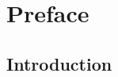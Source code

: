 \documentclass[../main/main]{subfiles}
\begin{document}
\renewcommand{\thefigure}{\Roman{chapter}.\Roman{figure}}
\renewcommand{\thetable}{\Roman{chapter}.\Roman{table}}

\renewcommand{\thechapter}{\Roman{chapter}}
\renewcommand{\thesection}{\Roman{chapter}.\Roman{section}}
\renewcommand{\thesubsection}{\Roman{chapter}.\Roman{section}.\Roman{subsection}}

\chapter{Preface}

\section{Introduction}
\lipsum[43-4]

\printbibliography

\setcounter{chapter}{0}

\renewcommand{\thetable}{\arabic{table}}
\renewcommand{\thefigure}{\arabic{figure}}

\renewcommand{\thechapter}{\arabic{chapter}}
\renewcommand{\thesection}{\arabic{section}}
\renewcommand{\thesubsection}{\arabic{section}.\arabic{subsection}}
\end{document}
